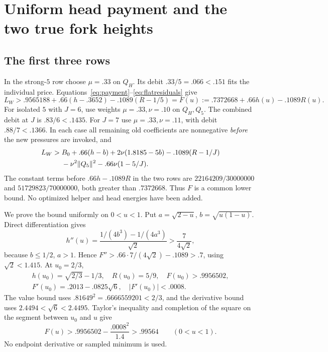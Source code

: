 \documentclass[11pt]{article}
\theoremstyle{definition}
\theoremstyle{remark}
\newcommand{\norm}[1]{\lVert #1\rVert}
\begin{document}
\section{Uniform head payment and the two true fork heights}
\label{sec:uniformhead}

\subsection{The first three rows}
In the strong-\(5\) row choose \(\mu=.33\) on \(Q_H\).
Its debit \(.33/5=.066<.151\) fits the individual price.
Equations~\eqref{eq:payment}--\eqref{eq:flatresiduals} give
\[
 L_W>.9565188+.66(h-.3652)-.1089(R-1/5)
       =F(u):=.7372668+.66h(u)-.1089R(u).
\]
For isolated \(5\) with \(J=6\), use weights
\(\mu=.33,\nu=.10\) on \(Q_H,Q_5\).
The combined debit at \(J\) is \(.83/6<.1435\).
For \(J=7\) use \(\mu=.33,\nu=.11\), with debit
\(.88/7<.1366\). In each case all remaining old coefficients
are nonnegative \emph{before} the new pressures are invoked, and
\begin{align}
\label{eq:isolatedfunding}
 L_W>{}&B_0+.66(h-b)+2\nu(1.8185-5b)
       -.1089(R-1/J)\notag\\
 &-\nu^2\norm{Q_5}^2-.66\nu(1-5/J).
\end{align}
The constant terms before \(.66h-.1089R\) in the two rows are
\(22164209/30000000\) and \(51729823/70000000\), both
greater than \(.7372668\). Thus \(F\) is a common lower bound.
No optimized helper and head energies have been added.

We prove the bound uniformly on \(0<u<1\). Put
\(a=\sqrt{2-u}\), \(b=\sqrt{u(1-u)}\). Direct differentiation gives
\begin{equation}
\label{eq:hcurvature}
 h''(u)=\frac{1/(4b^3)-1/(4a^3)}{\sqrt2}
        >\frac7{4\sqrt2},
\end{equation}
because \(b\leq1/2\), \(a>1\). Hence
\(F''>.66\cdot7/(4\sqrt2)-.1089>.7\), using \(\sqrt2<1.415\).
At \(u_0=2/3\),
\[
\begin{gathered}
 h(u_0)=\sqrt{2/3}-1/3,\quad R(u_0)=5/9,\quad F(u_0)>.9956502,\\
 F'(u_0)=.2013-.0825\sqrt6,\quad |F'(u_0)|<.0008.
\end{gathered}
\]
The value bound uses
\(.81649^2=.6666559201<2/3\), and the derivative bound uses
\(2.4494<\sqrt6<2.4495\). Taylor's inequality and completion
of the square on the segment between \(u_0\) and \(u\) give
\begin{equation}
\label{eq:Fseal}
 F(u)>.9956502-\frac{.0008^2}{1.4}>.99564
 \qquad(0<u<1).
\end{equation}
No endpoint derivative or sampled minimum is used.
\end{document}
